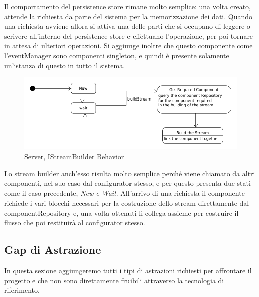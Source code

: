 Il comportamento del persistence store rimane molto semplice: una volta creato, attende la richiesta da parte del sistema per la memorizzazione dei dati.
Quando una richiesta avviene allora si attiva una delle parti che si occupano di leggere o scrivere all'interno del persistence store e effettuano l'operazione, per poi tornare in attesa di ulteriori operazioni. Si aggiunge inoltre che questo componente come l'eventManager sono componenti singleton, e quindi \`e presente solamente un'istanza di questo in tutto il sistema.

\begin{figure}[h]
\centering
\includegraphics[width=\textwidth]{Figures/LogicArchitecture/Server/IStreamBuiderBehavior}
\caption{Server, IStreamBuilder Behavior}
\end{figure}

Lo stream builder anch'esso risulta molto semplice perch\'e viene chiamato da altri componenti, nel suo caso dal configurator stesso, e per questo presenta due stati come il caso precedente, \textit{New e Wait}. All'arrivo di una richiesta il componente richiede i vari blocchi necessari per la costruzione dello stream direttamente dal componentRepository e, una volta ottenuti li collega assieme per costruire il flusso che poi restituir\`a al configurator stesso.

\subsection{Gap di Astrazione}

In questa sezione aggiungeremo tutti i tipi di astrazioni richiesti per affrontare il progetto e che non sono direttamente fruibili attraverso la tecnologia di riferimento.


